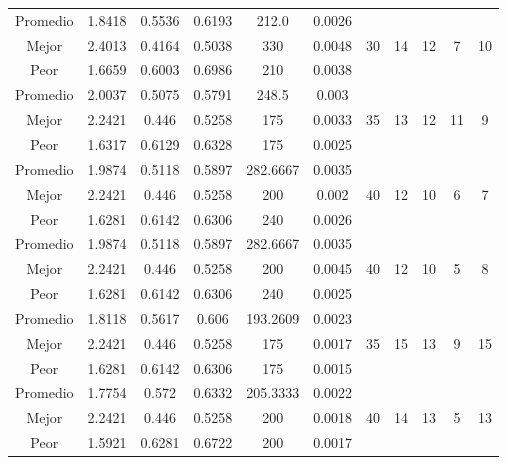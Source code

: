 \begin{table}[h!]
\begin{center}
\begin{tabular}{|c|c|c|c|c|c|c|c|c|c|c|}
        \hline
            Promedio  & 1.8418 & 0.5536 & 0.6193 & 212.0 & 0.0026 &  &  &  &  & \\
            \cline{1-6}
            Mejor & 2.4013 & 0.4164  & 0.5038 & 330 & 0.0048 & 30 & 14 & 12 & 7 & 10\\
            \cline{1-6}
            Peor & 1.6659 & 0.6003  & 0.6986 & 210 & 0.0038 &  &  &  &  & \\
        \hline
        \hline
            Promedio  & 2.0037 & 0.5075 & 0.5791 & 248.5 & 0.003 &  &  &  &  & \\
            \cline{1-6}
            Mejor & 2.2421 & 0.446  & 0.5258 & 175 & 0.0033 & 35 & 13 & 12 & 11 & 9\\
            \cline{1-6}
            Peor & 1.6317 & 0.6129  & 0.6328 & 175 & 0.0025 &  &  &  &  & \\
        \hline
        \hline
            Promedio  & 1.9874 & 0.5118 & 0.5897 & 282.6667 & 0.0035 &  &  &  &  & \\
            \cline{1-6}
            Mejor & 2.2421 & 0.446  & 0.5258 & 200 & 0.002 & 40 & 12 & 10 & 6 & 7\\
            \cline{1-6}
            Peor & 1.6281 & 0.6142  & 0.6306 & 240 & 0.0026 &  &  &  &  & \\
        \hline
        \hline
            Promedio  & 1.9874 & 0.5118 & 0.5897 & 282.6667 & 0.0035 &  &  &  &  & \\
            \cline{1-6}
            Mejor & 2.2421 & 0.446  & 0.5258 & 200 & 0.0045 & 40 & 12 & 10 & 5 & 8\\
            \cline{1-6}
            Peor & 1.6281 & 0.6142  & 0.6306 & 240 & 0.0025 &  &  &  &  & \\
        \hline
        \hline
            Promedio  & 1.8118 & 0.5617 & 0.606 & 193.2609 & 0.0023 &  &  &  &  & \\
            \cline{1-6}
            Mejor & 2.2421 & 0.446  & 0.5258 & 175 & 0.0017 & 35 & 15 & 13 & 9 & 15\\
            \cline{1-6}
            Peor & 1.6281 & 0.6142  & 0.6306 & 175 & 0.0015 &  &  &  &  & \\
        \hline
        \hline
            Promedio  & 1.7754 & 0.572 & 0.6332 & 205.3333 & 0.0022 &  &  &  &  & \\
            \cline{1-6}
            Mejor & 2.2421 & 0.446  & 0.5258 & 200 & 0.0018 & 40 & 14 & 13 & 5 & 13\\
            \cline{1-6}
            Peor & 1.5921 & 0.6281  & 0.6722 & 200 & 0.0017 &  &  &  &  & \\

\end{tabular}
\end{center}
\end{table}
